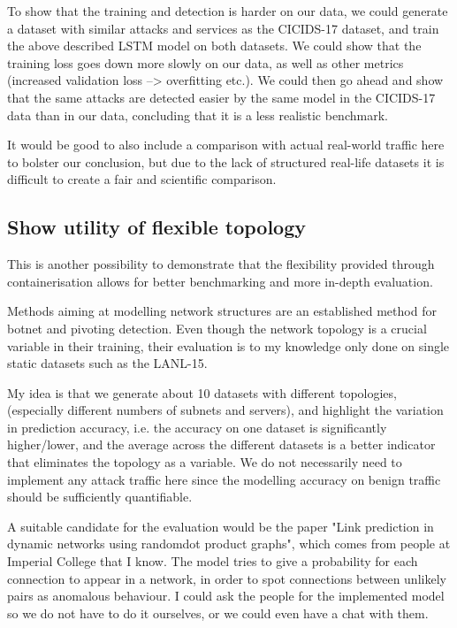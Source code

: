 \documentclass{article}
\begin{document}
To show that the training and detection is harder on our data, we could generate a dataset with similar attacks and services as the CICIDS-17 dataset, and train the above described LSTM model on both datasets. We could show that the training loss goes down more slowly on our data, as well as other metrics (increased validation loss --> overfitting etc.). We could then go ahead and show that the same attacks are detected easier by the same model in the CICIDS-17 data than in our data, concluding that it is a less realistic benchmark.

It would be good to also include a comparison with actual real-world traffic here to bolster our conclusion, but due to the lack of structured real-life datasets it is difficult to create a fair and scientific comparison. 


\subsection{Show utility of flexible topology}

This is another possibility to demonstrate that the flexibility provided through containerisation allows for better benchmarking and more in-depth evaluation.

Methods aiming at modelling network structures are an established method for botnet and pivoting detection. Even though the network topology is a crucial variable in their training, their evaluation is to my knowledge only done on single static datasets such as the LANL-15. 

My idea is that we generate about 10 datasets with different topologies, (especially different numbers of subnets and servers), and highlight the variation in prediction accuracy, i.e. the accuracy on one dataset is significantly higher/lower, and the average across the different datasets is a better indicator that eliminates the topology as a variable. We do not necessarily need to implement any attack traffic here since the modelling accuracy on benign traffic should be sufficiently quantifiable. 

A suitable candidate for the evaluation would be the paper "Link prediction in dynamic networks using randomdot product graphs", which comes from people at Imperial College that I know. The model tries to give a probability for each connection to appear in a network, in order to spot connections between unlikely pairs as anomalous behaviour. I could ask the people for the implemented model so we do not have to do it ourselves, or we could even have a chat with them.
\end{document}
